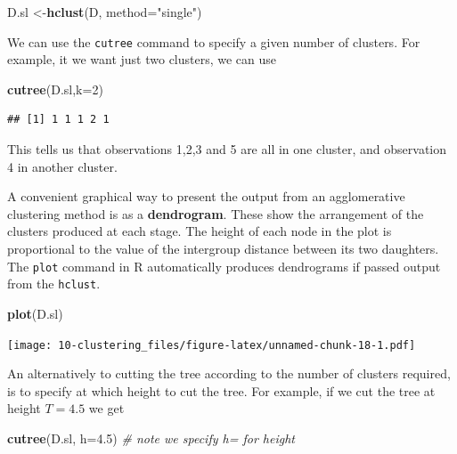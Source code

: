 \documentclass[
]{book}
\newenvironment{Shaded}{\begin{snugshade}}{\end{snugshade}}
\newcommand{\AttributeTok}[1]{\textcolor[rgb]{0.13,0.29,0.53}{#1}}
\newcommand{\CommentTok}[1]{\textcolor[rgb]{0.56,0.35,0.01}{\textit{#1}}}
\newcommand{\DecValTok}[1]{\textcolor[rgb]{0.00,0.00,0.81}{#1}}
\newcommand{\FloatTok}[1]{\textcolor[rgb]{0.00,0.00,0.81}{#1}}
\newcommand{\FunctionTok}[1]{\textcolor[rgb]{0.13,0.29,0.53}{\textbf{#1}}}
\newcommand{\NormalTok}[1]{#1}
\newcommand{\OtherTok}[1]{\textcolor[rgb]{0.56,0.35,0.01}{#1}}
\newcommand{\StringTok}[1]{\textcolor[rgb]{0.31,0.60,0.02}{#1}}
\theoremstyle{definition}
\theoremstyle{definition}
\theoremstyle{definition}
\theoremstyle{definition}
\theoremstyle{remark}
\begin{document}
\begin{Shaded}
\begin{Highlighting}[]
\NormalTok{D.sl }\OtherTok{\textless{}{-}}\FunctionTok{hclust}\NormalTok{(D, }\AttributeTok{method=}\StringTok{"single"}\NormalTok{)}
\end{Highlighting}
\end{Shaded}

We can use the \texttt{cutree} command to specify a given number of clusters. For example, it we want just two clusters, we can use

\begin{Shaded}
\begin{Highlighting}[]
\FunctionTok{cutree}\NormalTok{(D.sl,}\AttributeTok{k=}\DecValTok{2}\NormalTok{)}
\end{Highlighting}
\end{Shaded}

\begin{verbatim}
## [1] 1 1 1 2 1
\end{verbatim}

This tells us that observations 1,2,3 and 5 are all in one cluster, and observation 4 in another cluster.

A convenient graphical way to present the output from an agglomerative clustering method is as a \textbf{dendrogram}. These show the arrangement of the clusters produced at each stage. The height of each node in the plot is proportional to the value of the intergroup distance between its two daughters. The \texttt{plot} command in R automatically produces dendrograms if passed output from the \texttt{hclust}.

\begin{Shaded}
\begin{Highlighting}[]
\FunctionTok{plot}\NormalTok{(D.sl)}
\end{Highlighting}
\end{Shaded}

\texttt{[image: 10-clustering\_files/figure-latex/unnamed-chunk-18-1.pdf]}

An alternatively to cutting the tree according to the number of clusters required, is to specify at which height to cut the tree. For example, if we cut the tree at height \(T=4.5\) we get

\begin{Shaded}
\begin{Highlighting}[]
\FunctionTok{cutree}\NormalTok{(D.sl, }\AttributeTok{h=}\FloatTok{4.5}\NormalTok{) }\CommentTok{\# note we specify h= for height}
\end{Highlighting}
\end{Shaded}
\end{document}
